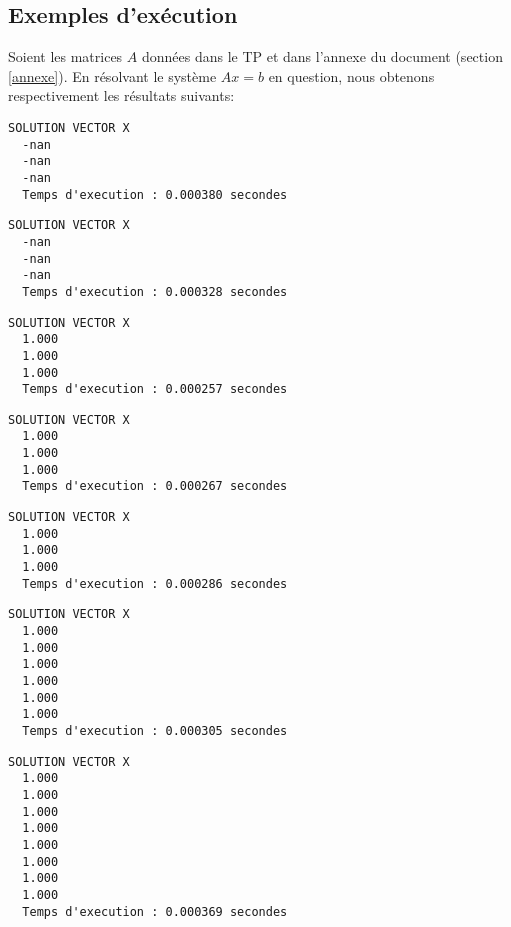 \subsection{Exemples d'exécution}
Soient les matrices $A$ données dans le TP et dans l'annexe du document (section \ref{annexe}).
En résolvant le système $Ax=b$ en question, nous obtenons respectivement les résultats suivants:
\\

\begin{lstlisting}[caption={$A_1X=B$} results, basicstyle=\fontsize{8}{10}\selectfont]
                  SOLUTION VECTOR X 
  -nan   
  -nan   
  -nan   
  Temps d'execution : 0.000380 secondes
\end{lstlisting}

\begin{lstlisting}[caption={$A_2X=B$} results, basicstyle=\fontsize{8}{10}\selectfont]
                  SOLUTION VECTOR X 
  -nan   
  -nan   
  -nan   
  Temps d'execution : 0.000328 secondes
\end{lstlisting}

\begin{lstlisting}[caption={$A_3X=B$} results, basicstyle=\fontsize{8}{10}\selectfont]
                  SOLUTION VECTOR X 
  1.000   
  1.000   
  1.000   
  Temps d'execution : 0.000257 secondes
\end{lstlisting}

\begin{lstlisting}[caption={$A_4X=B$} results, basicstyle=\fontsize{8}{10}\selectfont]
                  SOLUTION VECTOR X 
  1.000   
  1.000   
  1.000   
  Temps d'execution : 0.000267 secondes
\end{lstlisting}

\begin{lstlisting}[caption={$A_5X=B$} results, basicstyle=\fontsize{8}{10}\selectfont]
                  SOLUTION VECTOR X 
  1.000   
  1.000   
  1.000   
  Temps d'execution : 0.000286 secondes
\end{lstlisting}

\begin{lstlisting}[caption={$A_6X=B$} results, basicstyle=\fontsize{8}{10}\selectfont]
                  SOLUTION VECTOR X 
  1.000   
  1.000   
  1.000   
  1.000   
  1.000   
  1.000   
  Temps d'execution : 0.000305 secondes
\end{lstlisting}
\newpage
\begin{lstlisting}[caption={$A_7X=B$} results, basicstyle=\fontsize{5}{8}\selectfont]
                  SOLUTION VECTOR X 
  1.000   
  1.000   
  1.000   
  1.000   
  1.000   
  1.000   
  1.000   
  1.000   
  Temps d'execution : 0.000369 secondes
\end{lstlisting}


